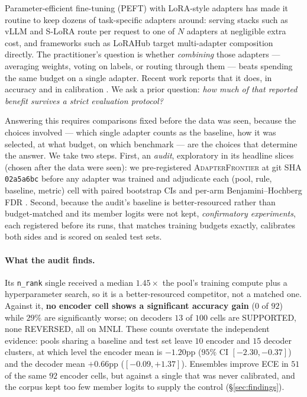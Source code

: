 \documentclass[11pt]{article}
\begin{document}
Parameter-efficient fine-tuning (PEFT) with LoRA-style adapters \citep{hu2021lora} has made it routine to keep dozens of task-specific adapters around: serving stacks such as vLLM and S-LoRA \citep{kwon2023efficient,sheng2024slora} route per request to one of $N$ adapters at negligible extra cost, and frameworks such as LoRAHub \citep{huang2023lorahub} target multi-adapter composition directly. The practitioner's question is whether \emph{combining} those adapters --- averaging weights, voting on labels, or routing through them --- beats spending the same budget on a single adapter. Recent work reports that it does, in accuracy and in calibration \citep{wang2023loraensembles,muhlematter2024loraensemble}. We ask a prior question: \emph{how much of that reported benefit survives a strict evaluation protocol?}

Answering this requires comparisons fixed before the data was seen, because the choices involved --- which single adapter counts as the baseline, how it was selected, at what budget, on which benchmark --- are the choices that determine the answer. We take two steps. First, an \emph{audit}, exploratory in its headline slices (chosen after the data were seen): we pre-registered \textsc{AdapterFrontier} at git SHA \texttt{02a5a6bc} before any adapter was trained and adjudicate each (pool, rule, baseline, metric) cell with paired bootstrap CIs and per-arm Benjamini--Hochberg FDR \citep{bh1995}. Second, because the audit's baseline is better-resourced rather than budget-matched and its member logits were not kept, \emph{confirmatory experiments}, each registered before its runs, that matches training budgets exactly, calibrates both sides and is scored on sealed test sets.

\paragraph{What the audit finds.} Its \texttt{n\_rank} single received a median $1.45\times$ the pool's training compute plus a hyperparameter search, so it is a better-resourced competitor, not a matched one. Against it, \textbf{no encoder cell shows a significant accuracy gain} ($0$ of $92$) while $29\%$ are significantly worse; on decoders $13$ of $100$ cells are SUPPORTED, none REVERSED, all on MNLI. These counts overstate the independent evidence: pools sharing a baseline and test set leave $10$ encoder and $15$ decoder clusters, at which level the encoder mean is ${-}1.20$pp ($95\%$ CI $[{-}2.30,{-}0.37]$) and the decoder mean ${+}0.66$pp ($[{-}0.09,{+}1.37]$). Ensembles improve ECE in $51$ of the same $92$ encoder cells, but against a single that was never calibrated, and the corpus kept too few member logits to supply the control (\S\ref{sec:findings}).
\end{document}
